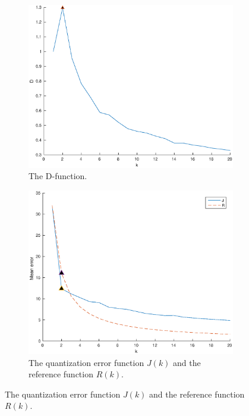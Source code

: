 \documentclass[10pt]{article}
\begin{document}
\begin{figure}[H]
  \centering
  \caption{Results for $kmax = 20$. The triangles give $k_{opt}$}
  \begin{subfigure}[b]{.45\textwidth}
    \includegraphics[width=\columnwidth]{Fig3.eps}
    \caption{The D-function.}
  \end{subfigure}
  \quad
  \begin{subfigure}[b]{.45\textwidth}
    \includegraphics[width=\columnwidth]{Fig4.eps}
    \caption{The quantization error function $J(k)$ and the reference function $R(k)$.}
  \end{subfigure}
  \label{fig2.1}
\end{figure}
\end{document}
